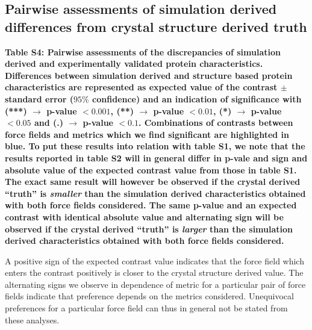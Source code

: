 \documentclass{article}\usepackage[table]{xcolor}
\renewcommand{\$}{$} %
\begin{document}
\subsection{Pairwise assessments of simulation derived differences from crystal structure derived truth}

\bf{Table S4:} Pairwise assessments of the discrepancies of simulation
derived and experimentally validated protein characteristics.
Differences between simulation derived and structure based protein
characteristics are represented as expected value of the contrast
$\pm$ standard error ($95\%$ confidence) and an indication of
significance with (***) $\rightarrow$ p-value $< 0.001$, (**)
$\rightarrow$ p-value $<0.01$, (*) $\rightarrow$ p-value $<0.05$ and
(.)  $\rightarrow$ p-value $<0.1$. Combinations of contrasts between
force fields and metrics which we find significant are highlighted in
blue. To put these results into relation with table S1, we note that
the results reported in table S2 will in general differ in p-vale and
sign and absolute value of the expected contrast value from those in
table S1. The exact same result will however be observed if the
crystal derived ``truth'' is {\it smaller} than the simulation derived
characteristics obtained with both force fields considered. The same
p-value and an expected contrast with identical absolute value and
alternating sign will be observed if the crystal derived ``truth'' is
{\it larger} than the simulation derived characteristics obtained with
both force fields considered.

A positive sign of the expected contrast value indicates that
the force field which enters the contrast positively is closer to the
crystal structure derived value. The alternating signs we observe in
dependence of metric for a particular pair of force fields indicate
that preference depends on the metrics considered. Unequivocal
preferences for a particular force field can thus in general not be
stated from these analyses. 
\end{document}
